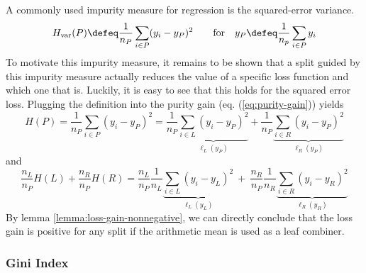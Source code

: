 \documentclass[../main.tex]{subfiles}
\begin{document}
A commonly used impurity measure for regression is the squared-error variance. 
$$
H_{\text{var}}(P) \defeq \frac{1}{n_{P}} \sum_{i \in P} (y_{i} - y_{P})^2 \hspace{2em} \text{for} \hspace{1em} y_{P} \defeq \frac{1}{n_{p}}\sum_{i\in P}y_{i}
$$
To motivate this impurity measure, it remains to be shown that a split guided by this impurity measure actually reduces the value of a specific loss function and which one that is. Luckily, it is easy to see that this holds for the squared error loss. Plugging the definition into the purity gain (eq. (\ref{eq:purity-gain})) yields
$$
H(P) = \frac{1}{n_{P}} \sum_{i \in P} (y_{i} - y_{P})^2
= \frac{1}{n_{P}}  
\underbrace{
 \sum_{i \in L} (y_{i} - y_P)^2 
 }_{\ell_{L}(y_{P})}
 +
\frac{1}{n_{P}}
 \underbrace{
 \sum_{i \in R} (y_{i} - y_{P}) ^2
 }_{\ell_{R}(y_{P})}
$$
and
$$
\frac{n_{L}}{n_{P}} H(L) +
\frac{n_{R}}{n_{P}} H(R) = 
\frac{n_{L}}{n_{P}} \frac{1}{n_{L}} 
\underbrace{
\sum_{i \in L} (y_{i} - y_{L})^2
}_{\ell_{L}(y_{L})}
~ + ~ 
\frac{n_{R}}{n_{P}} \frac{1}{n_{R}}
\underbrace{
 \sum_{i \in R} (y_{i} - y_{R})^2
}_{\ell_{R}(y_{R})}
$$
By lemma \ref{lemma:loss-gain-nonnegative}, we can directly conclude that the loss gain is positive for any split if the arithmetic mean is used as a leaf combiner.

\subsubsection{Gini Index}
\label{sec:gini-index}

\end{document}
